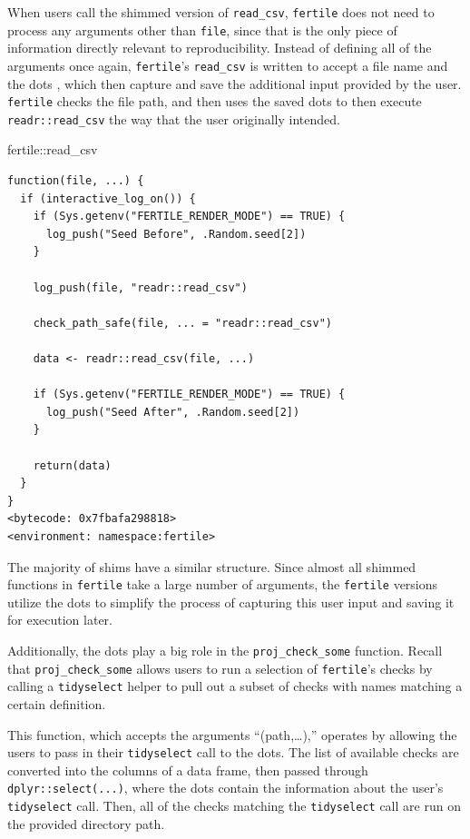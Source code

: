 \documentclass[12pt,twoside]{reedthesis}
\newenvironment{Shaded}{\begin{snugshade}}{\end{snugshade}}
\newcommand{\NormalTok}[1]{#1}
\newcommand{\SpecialCharTok}[1]{\textcolor[rgb]{0.00,0.00,0.00}{#1}}
\begin{document}
When users call the shimmed version of \texttt{read\_csv}, \texttt{fertile} does not need to process any arguments other than \texttt{file}, since that is the only piece of information directly relevant to reproducibility. Instead of defining all of the arguments once again, \texttt{fertile}'s \texttt{read\_csv} is written to accept a file name and the dots , which then capture and save the additional input provided by the user. \texttt{fertile} checks the file path, and then uses the saved dots to then execute \texttt{readr::read\_csv} the way that the user originally intended.
\begin{Shaded}
\begin{Highlighting}[]
\NormalTok{fertile}\SpecialCharTok{::}\NormalTok{read\_csv}
\end{Highlighting}
\end{Shaded}
\begin{verbatim}
function(file, ...) {
  if (interactive_log_on()) {
    if (Sys.getenv("FERTILE_RENDER_MODE") == TRUE) {
      log_push("Seed Before", .Random.seed[2])
    }

    log_push(file, "readr::read_csv")

    check_path_safe(file, ... = "readr::read_csv")

    data <- readr::read_csv(file, ...)

    if (Sys.getenv("FERTILE_RENDER_MODE") == TRUE) {
      log_push("Seed After", .Random.seed[2])
    }

    return(data)
  }
}
<bytecode: 0x7fbafa298818>
<environment: namespace:fertile>
\end{verbatim}
The majority of shims have a similar structure. Since almost all shimmed functions in \texttt{fertile} take a large number of arguments, the \texttt{fertile} versions utilize the dots to simplify the process of capturing this user input and saving it for execution later.

Additionally, the dots play a big role in the \texttt{proj\_check\_some} function. Recall that \texttt{proj\_check\_some} allows users to run a selection of \texttt{fertile}'s checks by calling a \texttt{tidyselect} helper to pull out a subset of checks with names matching a certain definition.

This function, which accepts the arguments ``(path,\ldots),'' operates by allowing the users to pass in their \texttt{tidyselect} call to the dots. The list of available checks are converted into the columns of a data frame, then passed through \texttt{dplyr::select(...)}, where the dots contain the information about the user's \texttt{tidyselect} call. Then, all of the checks matching the \texttt{tidyselect} call are run on the provided directory path.
\end{document}
